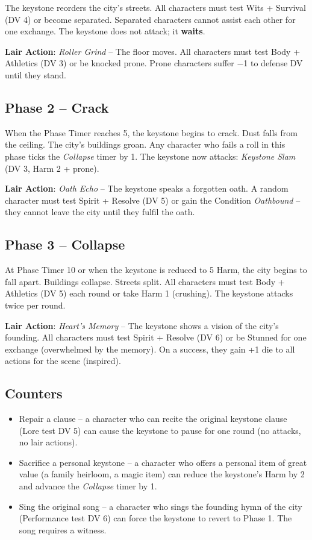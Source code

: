 \noindent The keystone reorders the city's streets. All characters must test Wits + Survival (DV 4) or become separated. Separated characters cannot assist each other for one exchange. The keystone does not attack; it \textbf{waits}.

\noindent\textbf{Lair Action}: \emph{Roller Grind} -- The floor moves. All characters must test Body + Athletics (DV 3) or be knocked prone. Prone characters suffer −1 to defense DV until they stand.

\subsection*{Phase 2 -- Crack}

\noindent When the Phase Timer reaches 5, the keystone begins to crack. Dust falls from the ceiling. The city's buildings groan. Any character who fails a roll in this phase ticks the \emph{Collapse} timer by 1. The keystone now attacks: \emph{Keystone Slam} (DV 3, Harm 2 + prone).

\noindent\textbf{Lair Action}: \emph{Oath Echo} -- The keystone speaks a forgotten oath. A random character must test Spirit + Resolve (DV 5) or gain the Condition \emph{Oathbound} -- they cannot leave the city until they fulfil the oath.

\subsection*{Phase 3 -- Collapse}

\noindent At Phase Timer 10 or when the keystone is reduced to 5 Harm, the city begins to fall apart. Buildings collapse. Streets split. All characters must test Body + Athletics (DV 5) each round or take Harm 1 (crushing). The keystone attacks twice per round.

\noindent\textbf{Lair Action}: \emph{Heart's Memory} -- The keystone shows a vision of the city's founding. All characters must test Spirit + Resolve (DV 6) or be Stunned for one exchange (overwhelmed by the memory). On a success, they gain +1 die to all actions for the scene (inspired).

\subsection*{Counters}

\begin{itemize}
    \item Repair a clause -- a character who can recite the original keystone clause (Lore test DV 5) can cause the keystone to pause for one round (no attacks, no lair actions).
    \item Sacrifice a personal keystone -- a character who offers a personal item of great value (a family heirloom, a magic item) can reduce the keystone's Harm by 2 and advance the \emph{Collapse} timer by 1.
    \item Sing the original song -- a character who sings the founding hymn of the city (Performance test DV 6) can force the keystone to revert to Phase 1. The song requires a witness.
\end{itemize}

